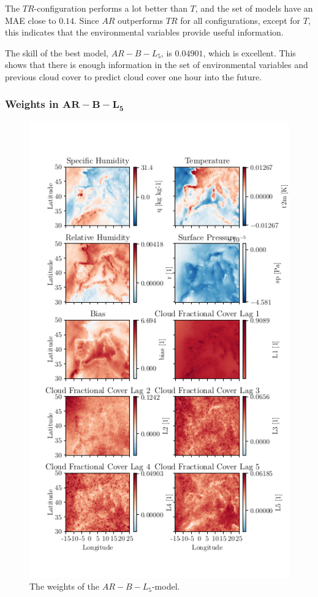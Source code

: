 The $TR$-configuration performs a lot better than $T$, and the set of models have an MAE close to $0.14$. Since $AR$ outperforms $TR$ for all configurations, except for $T$, this indicates that the environmental variables provide useful information. %

The skill of the best model, $AR-B-L_5$, is $0.04901$, which is excellent. This shows that there is enough information in the set of environmental variables and previous cloud cover to predict cloud cover one hour into the future.

\subsubsection{Weights in $\mathbf{AR-B-L_5}$}
\begin{figure}
    \centering
    \includegraphics[scale=0.87]{python_figs/weights_AR-B-L5_best_ar_model.png}
    \caption{The weights of the $AR-B-L_5$-model.}
    \label{fig:weights_best_model}
\end{figure}
